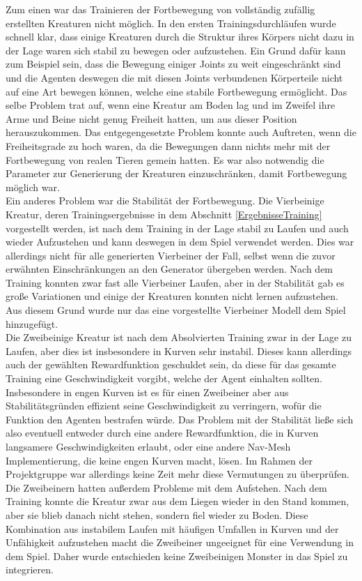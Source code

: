 Zum einen war das Trainieren der Fortbewegung von vollständig zufällig erstellten Kreaturen nicht möglich. 
In den ersten Trainingsdurchläufen wurde schnell klar, dass einige Kreaturen durch die Struktur ihres Körpers nicht dazu in der Lage waren sich stabil zu bewegen oder aufzustehen.
Ein Grund dafür kann zum Beispiel sein, dass die Bewegung einiger Joints zu weit eingeschränkt sind und die Agenten deswegen die mit diesen Joints verbundenen Körperteile nicht auf eine Art bewegen können, welche eine stabile Fortbewegung ermöglicht. Das selbe Problem trat auf, wenn eine Kreatur am Boden lag und im Zweifel ihre Arme und Beine nicht genug Freiheit hatten, um aus dieser Position herauszukommen.
Das entgegengesetzte Problem konnte auch Auftreten, wenn die Freiheitsgrade zu hoch waren, da die Bewegungen dann nichts mehr mit der Fortbewegung von realen Tieren gemein hatten. Es war also notwendig die Parameter zur Generierung der Kreaturen einzuschränken, damit Fortbewegung möglich war.\\

Ein anderes Problem war die Stabilität der Fortbewegung. Die Vierbeinige Kreatur, deren Trainingsergebnisse in dem Abschnitt \ref{ErgebnisseTraining} vorgestellt werden, ist nach dem Training in der Lage stabil zu Laufen und auch wieder Aufzustehen und kann deswegen in dem Spiel verwendet werden. 
Dies war allerdings nicht für alle generierten Vierbeiner der Fall, selbst wenn die zuvor erwähnten Einschränkungen an den Generator übergeben werden. Nach dem Training konnten zwar fast alle Vierbeiner Laufen, aber in der Stabilität gab es große Variationen und einige der Kreaturen konnten nicht lernen aufzustehen. Aus diesem Grund wurde nur das eine vorgestellte Vierbeiner Modell dem Spiel hinzugefügt.\\
Die Zweibeinige Kreatur ist nach dem Absolvierten Training zwar in der Lage zu Laufen, aber dies ist insbesondere in Kurven sehr instabil. Dieses kann allerdings auch der gewählten Rewardfunktion geschuldet sein, da diese für das gesamte Training eine Geschwindigkeit vorgibt, welche der Agent einhalten sollten. Insbesondere in engen Kurven ist es für einen Zweibeiner aber aus Stabilitätsgründen effizient seine Geschwindigkeit zu verringern, wofür die Funktion den Agenten bestrafen würde. Das Problem mit der Stabilität ließe sich also eventuell entweder durch eine andere Rewardfunktion, die in Kurven langsamere Geschwindigkeiten erlaubt, oder eine andere Nav-Mesh Implementierung, die keine engen Kurven macht, lösen. Im Rahmen der Projektgruppe war allerdings keine Zeit mehr diese Vermutungen zu überprüfen.\\
Die Zweibeinern hatten außerdem Probleme mit dem Aufstehen. Nach dem Training konnte die Kreatur zwar aus dem Liegen wieder in den Stand kommen, aber sie blieb danach nicht stehen, sondern fiel wieder zu Boden. Diese Kombination aus instabilem Laufen mit häufigen Umfallen in Kurven und der Unfähigkeit aufzustehen macht die Zweibeiner ungeeignet für eine Verwendung in dem Spiel. Daher wurde entschieden keine Zweibeinigen Monster in das Spiel zu integrieren. \\

